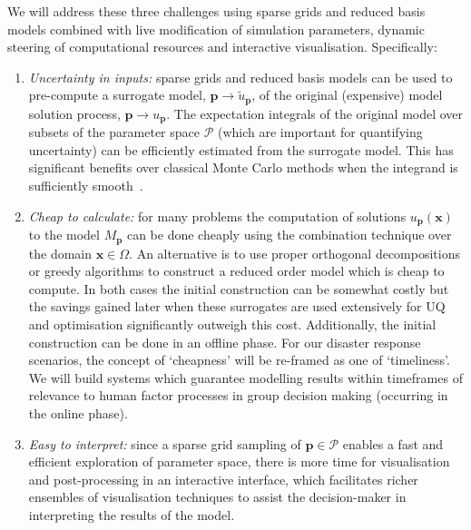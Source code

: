 We will address these three challenges using sparse grids and reduced
basis models combined with live modification of simulation parameters,
dynamic steering of computational resources and interactive
visualisation. Specifically:
\begin{enumerate}
\item \emph{Uncertainty in inputs:} sparse grids and reduced basis models can be used
  to pre-compute a surrogate model, $\mathbf{p} \rightarrow \tilde{u}_{\mathbf{p}}$, of the original
  (expensive) model solution process, $\mathbf{p} \rightarrow {u}_{\mathbf{p}}$.
  The expectation integrals of the original model over subsets of the
  parameter space $\mathcal{P}$ (which are important for quantifying
  uncertainty) can be efficiently estimated from the
  surrogate model. This has
  significant benefits over classical Monte Carlo methods when the
  integrand is sufficiently
  smooth~\parencite{JakemanRoberts2013,FranzelinDiehlPfluger2014}.

\item \emph{Cheap to calculate:} for many problems the computation
  of solutions $u_{\mathbf{p}}(\mathbf{x})$ to the model
  $M_{\mathbf{p}}$ can be done cheaply using the combination technique
  over the domain $\mathbf{x}\in\Omega$. An alternative is to use
  proper orthogonal decompositions or greedy algorithms to construct a
  reduced order model which is cheap to compute. In both
  cases the initial construction can be somewhat costly but the
  savings gained later when these surrogates are used extensively for
  UQ and optimisation significantly outweigh this cost. Additionally,
  the initial construction can be done in an offline phase. For our
  disaster response scenarios, the concept of `cheapness' will be
  re-framed as one of `timeliness'. We will build systems which
  guarantee modelling results within timeframes of
  relevance to human factor processes in group decision making
  (occurring in the online phase).

\item \emph{Easy to interpret:} since a sparse grid sampling of
  $\mathbf{p}\in\mathcal{P}$ enables a fast and efficient exploration
  of parameter space, there is more time for visualisation and
  post-processing in an interactive interface, which facilitates
  richer ensembles of visualisation techniques to assist the
  decision-maker in interpreting the results of the model.
\end{enumerate}


